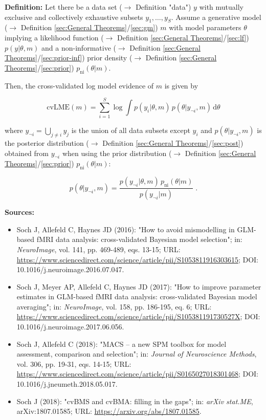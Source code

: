 \documentclass[a4paper,12pt,twoside]{book}
\begin{document}
\textbf{Definition:} Let there be a data set ($\rightarrow$ Definition "data") $y$ with mutually exclusive and collectively exhaustive subsets $y_1, \ldots, y_S$. Assume a generative model ($\rightarrow$ Definition \ref{sec:General Theorems}/\ref{sec:gm}) $m$ with model parameters $\theta$ implying a likelihood function ($\rightarrow$ Definition \ref{sec:General Theorems}/\ref{sec:lf}) $p(y \vert \theta, m)$ and a non-informative ($\rightarrow$ Definition \ref{sec:General Theorems}/\ref{sec:prior-inf}) prior density ($\rightarrow$ Definition \ref{sec:General Theorems}/\ref{sec:prior}) $p_{\mathrm{ni}}(\theta \vert m)$.

Then, the cross-validated log model evidence of $m$ is given by

\begin{equation} \label{eq:cvlme-cvLME}
\mathrm{cvLME}(m) = \sum_{i=1}^{S} \log \int p( y_i \vert \theta, m ) \, p( \theta \vert y_{\neg i}, m ) \, \mathrm{d}\theta
\end{equation}

where $y_{\neg i} = \bigcup_{j \neq i} y_j$ is the union of all data subsets except $y_i$ and $p( \theta \vert y_{\neg i}, m )$ is the posterior distribution ($\rightarrow$ Definition \ref{sec:General Theorems}/\ref{sec:post}) obtained from $y_{\neg i}$ when using the prior distribution ($\rightarrow$ Definition \ref{sec:General Theorems}/\ref{sec:prior}) $p_{\mathrm{ni}}(\theta \vert m)$:

\begin{equation} \label{eq:cvlme-post}
p( \theta \vert y_{\neg i}, m ) = \frac{p( y_{\neg i} \vert \theta, m ) \, p_{\mathrm{ni}}(\theta \vert m)}{p( y_{\neg i} \vert m )} \; .
\end{equation}


\vspace{1em}
\textbf{Sources:}
\begin{itemize}
\item Soch J, Allefeld C, Haynes JD (2016): "How to avoid mismodelling in GLM-based fMRI data analysis: cross-validated Bayesian model selection"; in: \textit{NeuroImage}, vol. 141, pp. 469-489, eqs. 13-15; URL: \url{https://www.sciencedirect.com/science/article/pii/S1053811916303615}; DOI: 10.1016/j.neuroimage.2016.07.047.
\item Soch J, Meyer AP, Allefeld C, Haynes JD (2017): "How to improve parameter estimates in GLM-based fMRI data analysis: cross-validated Bayesian model averaging"; in: \textit{NeuroImage}, vol. 158, pp. 186-195, eq. 6; URL: \url{https://www.sciencedirect.com/science/article/pii/S105381191730527X}; DOI: 10.1016/j.neuroimage.2017.06.056.
\item Soch J, Allefeld C (2018): "MACS – a new SPM toolbox for model assessment, comparison and selection"; in: \textit{Journal of Neuroscience Methods}, vol. 306, pp. 19-31, eqs. 14-15; URL: \url{https://www.sciencedirect.com/science/article/pii/S0165027018301468}; DOI: 10.1016/j.jneumeth.2018.05.017.
\item Soch J (2018): "cvBMS and cvBMA: filling in the gaps"; in: \textit{arXiv stat.ME}, arXiv:1807.01585; URL: \url{https://arxiv.org/abs/1807.01585}.
\end{itemize}
\end{document}
